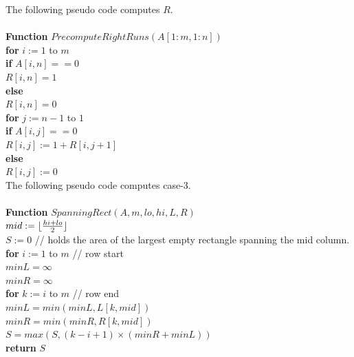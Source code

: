\documentclass[11pt]{article}
\DeclarePairedDelimiter\floor{\lfloor}{\rfloor}
\begin{document}
The following pseudo code computes $R$.\\\\
\textbf{Function} $PrecomputeRightRuns(A[1:m, 1:n])$\\
\-\hspace{2em} \textbf{for} $i := 1$ to $m$\\
\-\hspace{4em} \textbf{if} $A[i,n] == 0$\\
\-\hspace{6em} $R[i,n] = 1$\\
\-\hspace{4em} \textbf{else}\\
\-\hspace{6em} $R[i,n] = 0$\\
\-\hspace{4em} \textbf{for} $j := n-1$ to $1$\\
\-\hspace{6em} \textbf{if} $A[i,j] == 0$\\
\-\hspace{8em} $R[i,j] := 1 + R[i, j+1]$\\
\-\hspace{6em} \textbf{else}\\
\-\hspace{8em} $R[i,j] := 0$\\

The following pseudo code computes case-3.\\\\
\textbf{Function} $SpanningRect(A,m,lo,hi,L,R)$\\
\-\hspace{2em} $mid := \floor{\frac{hi+lo}{2}}$\\
\-\hspace{2em} $S := 0$ // holds the area of the largest empty
rectangle spanning the mid column.\\
\-\hspace{2em} \textbf{for} $i := 1$ to $m$ // row start\\
\-\hspace{4em} $minL = \infty$\\
\-\hspace{4em} $minR = \infty$\\
\-\hspace{4em} \textbf{for} $k := i$ to $m$ // row end\\
\-\hspace{6em} $minL = min(minL, L[k,mid])$\\
\-\hspace{6em} $minR = min(minR, R[k,mid])$\\
\-\hspace{6em} $S = max(S, (k-i+1) \times (minR+minL))$\\
\-\hspace{2em} \textbf{return} $S$\\
\end{document}
